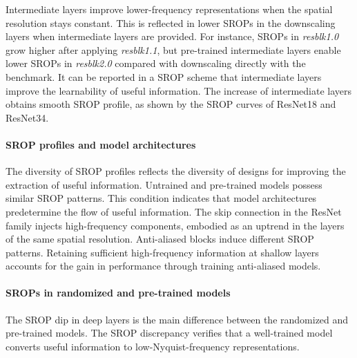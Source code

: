 \documentclass{article}
\begin{document}
Intermediate layers improve lower-frequency representations when the spatial resolution stays constant. This is reflected in lower SROPs in the downscaling layers when intermediate layers are provided. For instance, SROPs in \textit{resblk1.0} grow higher after applying \textit{resblk1.1}, but pre-trained intermediate layers enable lower SROPs in \textit{resblk2.0} compared with downscaling directly with the benchmark. It can be reported in a SROP scheme that intermediate layers improve the learnability of useful information. The increase of intermediate layers obtains smooth SROP profile, as shown by the SROP curves of ResNet18 and ResNet34.
\paragraph{SROP profiles and model architectures}
The diversity of SROP profiles reflects the diversity of designs for improving the extraction of useful information. Untrained and pre-trained models possess similar SROP patterns. This condition indicates that model architectures predetermine the flow of useful information. The skip connection in the ResNet family injects high-frequency components, embodied as an uptrend in the layers of the same spatial resolution. Anti-aliased blocks induce different SROP patterns. Retaining sufficient high-frequency information at shallow layers accounts for the gain in performance through training anti-aliased models.

\paragraph{SROPs in randomized and pre-trained models}
The SROP dip in deep layers is the main difference between the randomized and pre-trained models. The SROP discrepancy verifies that a well-trained model converts useful information to low-Nyquist-frequency representations.
\end{document}
